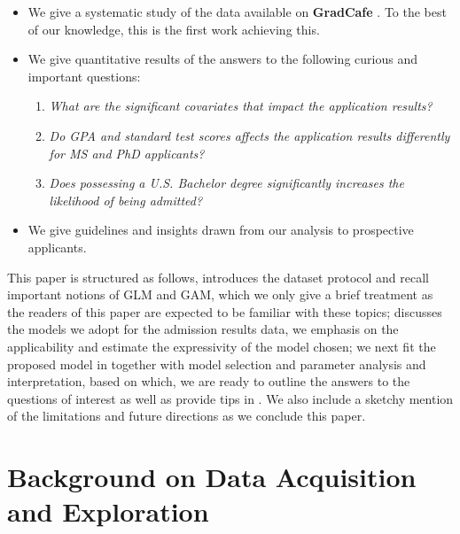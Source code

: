 \documentclass{article}
\newcommand{\noun}[1]{\textbf{#1}}
\begin{document}
\begin{itemize}
    \item We give a systematic study of the data available on \noun{GradCafe} \cite{GradCafe}.
	To the best of our knowledge, this is the first work achieving this.

    \item We give quantitative results of the answers to the following curious and important
	questions:
	    \begin{enumerate}
		\item \emph{What are the significant covariates that impact the application results?}

		\item \emph{Do GPA and standard test scores affects the application results differently for MS
		    and PhD applicants?}

		\item \emph{Does possessing a U.S. Bachelor degree significantly increases the likelihood of being admitted?}
	    \end{enumerate}

    \item We give guidelines and insights drawn from our analysis to prospective applicants.

\end{itemize}

This paper is structured as follows,  introduces
the dataset protocol and recall important notions of GLM and GAM, which
we only give a brief treatment as the readers of this paper are expected
to be familiar with these topics;  discusses the models
we adopt for the admission results data, we emphasis on the applicability
and estimate the expressivity of the model chosen; we next fit the proposed
model in  together with model selection and parameter analysis
and interpretation, based on which, we are ready to outline the answers to the
questions of interest as well as provide tips in . We also
include a sketchy mention of the limitations and future directions as we
conclude this paper.


\section{Background on Data Acquisition and Exploration} \label{sec:background}
\end{document}
